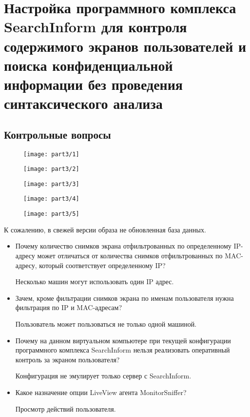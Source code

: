 \section{Настройка программного комплекса SearchInform для контроля содержимого
экранов пользователей и поиска конфиденциальной информации без проведения
синтаксического анализа }

\subsection{Контрольные вопросы}

\begin{figure}[H]
  \centering
  \texttt{[image: part3/1]}
\end{figure}

\begin{figure}[H]
  \centering
  \texttt{[image: part3/2]}
\end{figure}

\begin{figure}[H]
  \centering
  \texttt{[image: part3/3]}
\end{figure}

\begin{figure}[H]
  \centering
  \texttt{[image: part3/4]}
\end{figure}

\begin{figure}[H]
  \centering
  \texttt{[image: part3/5]}
\end{figure}

К сожалению, в свежей версии образа не обновленная база данных.

\begin{itemize}
  \item Почему количество снимков экрана отфильтрованных по определенному
    IP-адресу может отличаться от количества снимков отфильтрованных по
    MAC-адресу, который соответствует определенному IP?

    Несколько машин могут использовать один IP адрес.

  \item Зачем, кроме фильтрации снимков экрана по именам пользователя нужна
    фильтрация по  IP  и MAC-адресам?

    Пользователь может пользоваться не только одной машиной.

  \item Почему на данном виртуальном компьютере при текущей конфигурации
    программного комплекса SearchInform нельзя реализовать оперативный контроль
    за экраном пользователя?

    Конфигурация не эмулирует только сервер с SearchInform.

  \item Какое назначение опции LiveView агента MonitorSniffer?

    Просмотр действий пользователя.
\end{itemize}
